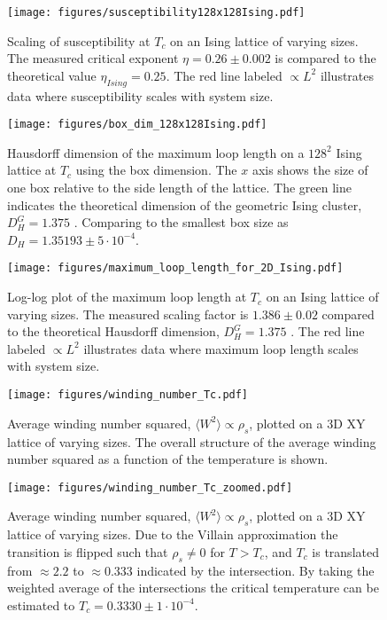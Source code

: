 
\begin{figure}[h!]
    \centering
        \texttt{[image: figures/susceptibility128x128Ising.pdf]}
    \caption{Scaling of susceptibility at $T_c$ on an Ising lattice of varying sizes. The measured critical exponent $\eta = 0.26 \pm 0.002$ is compared to the theoretical value $\eta_{Ising} = 0.25$. The red line labeled $\propto L^2$ illustrates data where susceptibility scales with system size.}
    \label{fig:results_isingsusc}
\end{figure}

\begin{figure}[h!]
    \centering
        \texttt{[image: figures/box\_dim\_128x128Ising.pdf]}
    \caption{Hausdorff dimension of the maximum loop length on a $128^2$ Ising lattice at $T_c$ using the box dimension. The $x$ axis shows the size of one box relative to the side length of the lattice. The green line indicates the theoretical dimension of the geometric Ising cluster, $D_H^G = 1.375$ \cite{Duplantier:GeoHausdorff}. Comparing to the smallest box size as $D_H = 1.35193 \pm 5 \cdot 10^{-4}$.}
    \label{fig:results_boxdimension}
\end{figure}

\begin{figure}[h!]
    \centering
        \texttt{[image: figures/maximum\_loop\_length\_for\_2D\_Ising.pdf]}
    \caption{Log-log plot of the maximum loop length at $T_c$ on an Ising lattice of varying sizes. The measured scaling factor is $1.386 \pm 0.02$ compared to the theoretical Hausdorff dimension, $D_H^G = 1.375$ \cite{Duplantier:GeoHausdorff}. The red line labeled $\propto L^2$ illustrates data where maximum loop length scales with system size.}
    \label{fig:results_maxloopdimension}
\end{figure}


\begin{figure}[h!]
    \centering
        \texttt{[image: figures/winding\_number\_Tc.pdf]}
    \caption{Average winding number squared, $\langle W^2 \rangle \propto \rho_s$, plotted on a 3D XY lattice of varying sizes. The overall structure of the average winding number squared as a function of the temperature is shown.}
    \label{fig:results_windingnumberTc}
\end{figure}


\begin{figure}[h!]
    \centering
        \texttt{[image: figures/winding\_number\_Tc\_zoomed.pdf]}
    \caption{Average winding number squared, $\langle W^2 \rangle \propto \rho_s$, plotted on a 3D XY lattice of varying sizes. Due to the Villain approximation the transition is flipped such that $\rho_s \neq 0$ for $T > T_c$, and $T_c$ is translated from $\approx 2.2$ to $\approx 0.333$ indicated by the intersection. By taking the weighted average of the intersections the critical temperature can be estimated to $T_c = 0.3330 \pm 1 \cdot 10^{-4}$.}
    \label{fig:results_windingnumberTcZoomed}
\end{figure}

